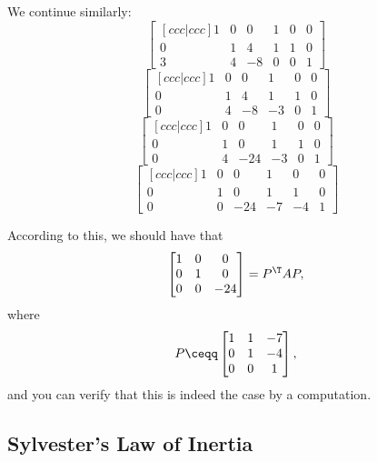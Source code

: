 \begin{exm}{}{}
	We continue similarly:
	\begin{equation}
		\begin{bmatrix}[c c c | c c c]
			1 & 0 & 0 & 1 & 0 & 0 \\
			0 & 1 & 4 & 1 & 1 & 0 \\
			3 & 4 & -8 & 0 & 0 & 1
		\end{bmatrix}
	\end{equation}
	\begin{equation}
		\begin{bmatrix}[c c c | c c c]
			1 & 0 & 0 & 1 & 0 & 0 \\
			0 & 1 & 4 & 1 & 1 & 0 \\
			0 & 4 & -8 & -3 & 0 & 1
		\end{bmatrix}
	\end{equation}
	\begin{equation}
		\begin{bmatrix}[c c c | c c c]
			1 & 0 & 0 & 1 & 0 & 0 \\
			0 & 1 & 0 & 1 & 1 & 0 \\
			0 & 4 & -24 & -3 & 0 & 1
		\end{bmatrix}
	\end{equation}
	\begin{equation}
		\begin{bmatrix}[c c c | c c c]
			1 & 0 & 0 & 1 & 0 & 0 \\
			0 & 1 & 0 & 1 & 1 & 0 \\
			0 & 0 & -24 & -7 & -4 & 1
		\end{bmatrix}
	\end{equation}
	
	According to this, we should have that
	\begin{equation}
		\begin{bmatrix}1 & 0 & 0 \\ 0 & 1 & 0 \\ 0 & 0 & -24\end{bmatrix}=P^{\T}AP,
	\end{equation}
	where
	\begin{equation}
		P\ceqq \begin{bmatrix}1 & 1 & -7 \\ 0 & 1 & -4 \\ 0 & 0 & 1\end{bmatrix},
	\end{equation}
	and you can verify that this is indeed the case by a computation.
\end{exm}

\subsection{Sylvester's Law of Inertia}

